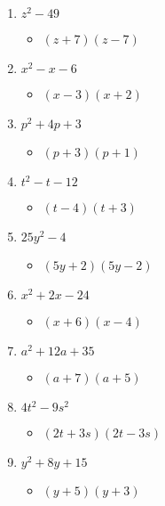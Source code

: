 \documentclass{article}
\begin{document}
\begin{onehalfspace}
\begin{enumerate}
        \item $z^{2} - 49$
        \begin{itemize}
            \item $(z + 7)(z - 7)$
        \end{itemize}

        \item $x^{2} - x - 6$
        \begin{itemize}
            \item $(x - 3)(x + 2)$
        \end{itemize}

        \item $p^{2} + 4p + 3$
        \begin{itemize}
            \item $(p + 3)(p + 1)$
        \end{itemize}

        \item $t^{2} - t - 12$
        \begin{itemize}
            \item $(t - 4)(t + 3)$
        \end{itemize}

        \item $25y^{2} - 4$
        \begin{itemize}
            \item $(5y + 2)(5y - 2)$
        \end{itemize}

        \item $x^{2} + 2x - 24$
        \begin{itemize}
            \item $(x + 6)(x - 4)$
        \end{itemize}

        \item $a^{2} + 12a + 35$
        \begin{itemize}
            \item $(a + 7)(a + 5)$
        \end{itemize}

        \item $4t^{2} - 9s^{2}$
        \begin{itemize}
            \item $(2t + 3s)(2t - 3s)$
        \end{itemize}

        \item $y^{2} + 8y + 15$
        \begin{itemize}
            \item $(y + 5)(y + 3)$
        \end{itemize}


\end{enumerate}
\end{onehalfspace}
\end{document}
